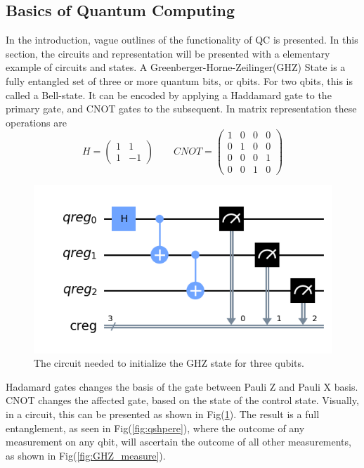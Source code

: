\subsection{Basics of Quantum Computing}
In the introduction, vague outlines of the functionality of QC is presented. In this section, the circuits and representation will be presented with a elementary example of circuits and states. A Greenberger-Horne-Zeilinger(GHZ) State is a  fully entangled set of three or more quantum bits, or qbits. For two qbits, this is called a Bell-state. It can be encoded by applying a Haddamard gate to the primary gate, and CNOT gates to the subsequent. In matrix representation these operations are
\begin{equation}
    H = \begin{pmatrix}
    1 & 1 \\
    1 & -1 
    \end{pmatrix} \qquad 
    CNOT = \begin{pmatrix}
    1 & 0 & 0 & 0 \\
    0 & 1 & 0 & 0 \\
    0 & 0 & 0 & 1 \\
    0 & 0 & 1 & 0 
    \end{pmatrix}
\end{equation}
\begin{figure}
    \centering
    \includegraphics[width=\linewidth]{figs/GHZ.png}
    \caption{The circuit needed to initialize the GHZ state for three qubits.}
    \label{fig:GHZ_circ}
\end{figure}
Hadamard gates changes the basis of the gate between Pauli Z and Pauli X basis. CNOT changes the affected gate, based on the state of the control state. Visually, in a circuit, this can be presented as shown in Fig(\ref{fig:GHZ_circ}).
The result is a full entanglement, as seen in Fig(\ref{fig:qshpere}), where the outcome of any measurement on any qbit, will ascertain the outcome of all other measurements, as shown in Fig(\ref{fig:GHZ_measure}).
